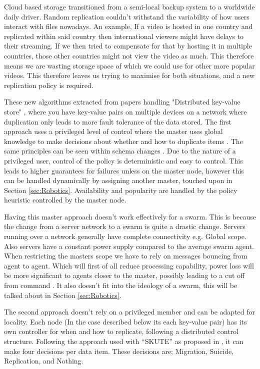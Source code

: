 \documentclass{UoYCSproject}
\begin{document}
Cloud based storage transitioned from a semi-local backup system to a worldwide daily driver.
Random replication couldn’t withstand the variability of how users interact with files nowadays.
An example, If a video is hosted in one country and replicated within said country then international viewers might have delays to their streaming.
If we then tried to compensate for that by hosting it in multiple countries, those other countries might not view the video as much.
This therefore means we are wasting storage space of which we could use for other more popular videos.
This therefore leaves us trying to maximise for both situations, and a new replication policy is required.

These new algorithms extracted from papers handling "Distributed key-value store" \cite{Key-Value}, where you have key-value pairs on multiple devices on a network where duplication only leads to more fault tolerance of the data stored. 
The first approach uses a privileged level of control where the master uses global knowledge to make decisions about whether and how to duplicate items \cite{Avalability storage, Patent}.
The same principles can be seen within schema changes \cite{Scheme changes}.
Due to the nature of a privileged user, control of the policy is deterministic and easy to control.
This leads to higher guarantees for failures unless on the master node, however this can be handled dynamically by assigning another master, touched upon in Section \ref{sec:Robotics}.
Availability and popularity are handled by the policy heuristic controlled by the master node.

Having this master approach doesn’t work effectively for a swarm.
This is because the change from a server network to a swarm is quite a drastic change.
Servers running over a network generally have complete connectivity e.g. Global scope.
Also servers have a constant power supply compared to the average swarm agent.
When restricting the masters scope we have to rely on messages bouncing from agent to agent. 
Which will first of all reduce processing capability, power loss will be more significant to agents closer to the master, possibly leading to a cut off from command \cite{Swarm robotics reviewed}.
It also doesn’t fit into the ideology of a swarm, this will be talked about in Section \ref{sec:Robotics}.

The second approach doesn’t rely on a privileged member and can be adapted for locality.
Each node (In the case described below its each key-value pair) has its own controller for when and how to replicate, following a distributed control structure.
Following the approach used with “SKUTE” as proposed in \cite{Distributed Storage}, it can make four decisions per data item.
These decisions are; Migration, Suicide, Replication, and Nothing.
\end{document}
